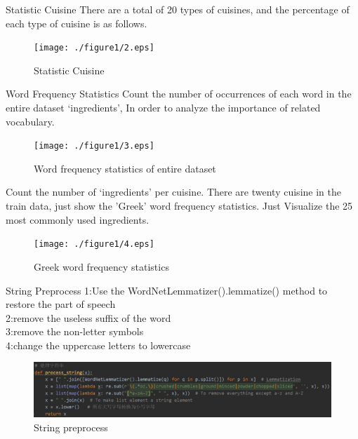 \documentclass[
 size=14pt,
 paper=smartboard,  %
 mode=present, 		%
 display=slides, 	%
 style=tuliplab,  	%
 pauseslide,
 fleqn,leqno]{powerdot}
\begin{document}
\begin{slide}{Statistic Cuisine}
There are a total of 20 types of cuisines, and the percentage of each type of cuisine is as follows. 
\begin{figure}[htbp]
	\texttt{[image: ./figure1/2.eps]}
	\caption{Statistic Cuisine}
\end{figure}
\end{slide}

\begin{slide}{Word Frequency Statistics}
	Count the number of occurrences of each word in the entire dataset ‘ingredients’, In order to analyze the importance of related vocabulary. 
	\begin{figure}[htbp]
		\texttt{[image: ./figure1/3.eps]}
		\caption{Word frequency statistics of entire dataset}
	\end{figure}
\end{slide}

\begin{slide}{}
	Count the number of ‘ingredients’ per cuisine. There are twenty cuisine in the train data, just show the 'Greek' word frequency statistics. Just Visualize the 25 most commonly used ingredients.
	\begin{figure}[htbp]
		\texttt{[image: ./figure1/4.eps]}
		\caption{Greek word frequency statistics}
	\end{figure}
\end{slide}

\begin{slide}{String Preprocess}
	1:Use the WordNetLemmatizer().lemmatize() method to restore the part of speech\\
	2:remove the useless suffix of the word\\
	3:remove the non-letter symbols\\
	4:change the uppercase letters to lowercase
	\begin{figure}[htbp]
		\includegraphics[scale=0.75]{./figure1/5.eps}
		\caption{String preprocess}
	\end{figure}
\end{slide}
\end{document}

